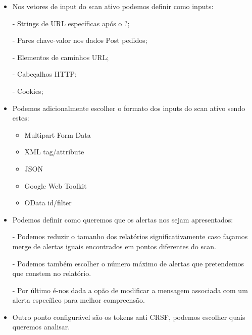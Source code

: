 \begin{itemize}
\begin{itemize}
\item Nos vetores de input do scan ativo podemos definir como inputs:

\par - Strings de URL específicas após o ?; \newline

\par - Pares chave-valor nos dados Post pedidos; \newline

\par - Elementos de caminhos URL; \newline

\par - Cabeçalhos HTTP; \newline

\par - Cookies; \newline

\item Podemos adicionalmente escolher o formato dos inputs do scan ativo sendo estes:

\begin{itemize}

\item Multipart Form Data	
\item XML tag/attribute	
\item JSON	
\item Google Web Toolkit	
\item OData id/filter

\end{itemize}

\item Podemos definir como queremos que os alertas nos sejam apresentados:

\par - Podemos reduzir o tamanho dos relatórios significativamente caso façamos merge de alertas iguais encontrados em pontos diferentes do scan.  \newline
\par - Podemos também escolher o número máximo de alertas que pretendemos que constem no relatório. \newline
\par - Por último é-nos dada a opão de modificar a mensagem associada com um alerta específico para melhor compreensão. \newline

\item Outro ponto configurável são os tokens anti CRSF, podemos escolher quais queremos analisar.


\end{itemize}
\end{itemize}
